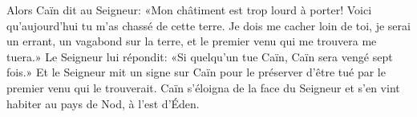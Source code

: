 Alors Caïn dit au Seigneur: «Mon châtiment est trop lourd à porter!
	Voici qu’aujourd’hui tu m’as chassé de cette terre.
	Je dois me cacher loin de toi, je serai un errant,
	un vagabond sur la terre, et le premier venu qui me trouvera me tuera.»
Le Seigneur lui répondit:
	«Si quelqu’un tue Caïn, Caïn sera vengé sept fois.»
Et le Seigneur mit un signe sur Caïn
	pour le préserver d’être tué par le premier venu qui le trouverait.
Caïn s’éloigna de la face du Seigneur
	et s’en vint habiter au pays de Nod, à l’est d’Éden.
